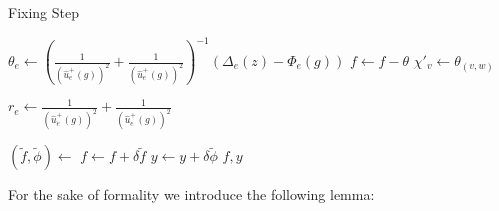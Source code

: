 \begin{algorithm}
\caption{Fixing Step}
\begin{algorithmic}[1]
    \State $\theta_e \gets \left(\frac{1}{(\hat u_e^+(g))^2}+\frac{1}{(\hat u_e^+(g))^2} \right)^{-1}(
    \Delta_e(z)-\Phi_e(g))$
\EndFor
\State $f \gets f - \theta$
\State $\chi'_v \gets \theta_{(v,w)}$
\EndFor

    \State $r_e \gets \frac{1}{(\hat u_e^+(g))^2}+\frac{1}{(\hat u_e^+(g))^2}$
\EndFor

\State $(\tilde f, \tilde \phi) \gets$ 
\State $f \gets f + \delta\tilde f$
\State $y \gets y + \delta\tilde \phi$
\State \Return $f,y$
\EndFunction
\end{algorithmic}
\end{algorithm}

For the sake of formality we introduce the following lemma:

